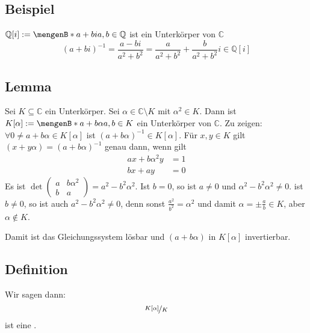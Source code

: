 \subsection[{Beispiel: $\mathds{Q}[i]$ ist Unterkörper von $\mathds{C}$}]{Beispiel} %
\label{sub:108}
$\mathds{Q}[i] := \set[a+ b i]{a,b \in \mathds{Q}} $ ist ein Unterkörper von $\mathds{C}$
\[
	(a+bi)^{-1} = \frac{a-bi}{a^2 + b^2} = \frac{a}{a^2 +b^2}+ \frac{b}{a^2 + b^2} i \in \mathds{Q}[i]   
\]

\subsection[{Lemma: Wenn $K$ Unterkörper von $\mathds{C}$, dann ist $K[\alpha]$ auch Unterkörper von $\mathds{C}$}]{Lemma} %
\label{sub:109}
Sei $K \subseteq \mathds{C}$ ein Unterkörper. Sei $\alpha \in \mathds{C} \setminus K$ mit $\alpha^2 \in K$. Dann ist $K[\alpha] := \set[a+ b \alpha]{a,b \in K} $ ein
Unterkörper von $\mathds{C}$.
Zu zeigen: $\forall 0 \not= a + b \alpha \in K[\alpha]$ ist $(a+ b \alpha)^{-1} \in K[\alpha]$. Für $x,y \in K$ gilt $(x+y \alpha) = (a+ b \alpha) ^{-1}$ genau dann, wenn
gilt 
\begin{align*}
	ax + b \alpha^2 y &= 1 \\
	 bx + ay &= 0
\end{align*}
Es ist $\det \begin{pmatrix}
	a	& b \alpha^2 \\
	b & a
\end{pmatrix}= a^2 - b^2 \alpha^2$. Ist $b=0$, so ist $a\not=0$
und $\alpha^2 - b^2 \alpha^2 \not= 0$. ist $b \not= 0$, so ist auch $a^2 - b^2	\alpha^2 \not= 0$, denn sonst $\frac{a^2}{b^2} = \alpha^2 $ und damit 
$\alpha = \pm \frac{a}{b} \in K$, aber $\alpha \not\in K$.  

Damit ist das Gleichungssystem lösbar und $(a+ b \alpha)$ in $K[\alpha]$ invertierbar. \bewende

\subsection[Definition: Quadratische Körpererweiterung]{Definition} %
\label{sub:1010}
Wir sagen dann: 
\[
	\nicefrac{K[\alpha]}{K} 
\]
ist eine .

